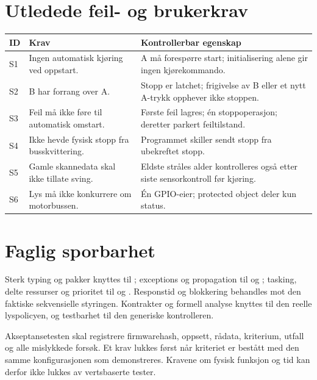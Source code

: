 \section{Utledede feil- og brukerkrav}
\begin{tabularx}{\textwidth}{@{}P{13mm}Y Y@{}}\toprule
ID & Krav & Kontrollerbar egenskap\\\midrule
S1 & Ingen automatisk kjøring ved oppstart. & A må forespørre start; initialisering alene gir ingen kjørekommando.\\
S2 & B har forrang over A. & Stopp er latchet; frigivelse av B eller et nytt A-trykk opphever ikke stoppen.\\
S3 & Feil må ikke føre til automatisk omstart. & Første feil lagres; én stoppoperasjon; deretter parkert feiltilstand.\\
S4 & Ikke hevde fysisk stopp fra busskvittering. & Programmet skiller sendt stopp fra ubekreftet stopp.\\
S5 & Gamle skannedata skal ikke tillate sving. & Eldste stråles alder kontrolleres også etter siste sensorkontroll før kjøring.\\
S6 & Lys må ikke konkurrere om motorbussen. & Én GPIO-eier; protected object deler kun status.\\\bottomrule
\end{tabularx}

\section{Faglig sporbarhet}
Sterk typing og pakker knyttes til ; exceptions og
propagation til  og ;
tasking, delte ressurser og prioritet til  og
. Responstid og blokkering behandles mot
den faktiske sekvensielle styringen. Kontrakter og formell analyse knyttes
til den reelle lyspolicyen, og testbarhet til den generiske kontrolleren.

Akseptansetesten skal registrere firmwarehash, oppsett, rådata, kriterium,
utfall og alle mislykkede forsøk. Et krav lukkes først når kriteriet er
bestått med den samme konfigurasjonen som demonstreres. Kravene om
fysisk funksjon og tid kan derfor ikke lukkes av vertsbaserte tester.
